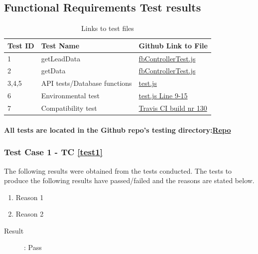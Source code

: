 \documentclass{article}
\begin{document}
\subsection{Functional Requirements Test results}
\begin{table}[H]
\centering
\label{link_table}
\begin{tabular}{|l|l|l|}
\hline
Test ID    & Test Name   & Github Link to File \\ \hline \hline
1          & getLeadData &  \href{https://github.com/QuintonWeenink/ValknutSolutions/blob/develop/test/fbControllerTest.js}{fbControllerTest.js}         \\ \hline
2          & getData  &  \href{https://github.com/QuintonWeenink/ValknutSolutions/blob/develop/test/fbControllerTest.js}{fbControllerTest.js}       \\ \hline
3,4,5      & API tests/Database functions & \href{https://github.com/QuintonWeenink/ValknutSolutions/blob/develop/test/test.js}{test.js}         \\ \hline
6          &  Environmental test  & \href{https://github.com/QuintonWeenink/ValknutSolutions/blob/develop/test/test.js}{test.js Line 9-15}\\ \hline
7		   & Compatibility test & \href{https://travis-ci.com/QuintonWeenink/ValknutSolutions/builds/30866212}{Travis CI build nr 130} \\ \hline
\end{tabular}
\caption{Links to test files}
\end{table}
\paragraph{All tests are located in the Github repo's testing directory:\href{https://github.com/QuintonWeenink/ValknutSolutions}{Repo}}


\subsubsection{Test Case 1 - TC \ref{test1}}
The following results were obtained from the tests conducted. The tests to produce the
following results have passed/failed and the reasons are stated below.
\begin{enumerate}
	\item Reason 1
	\item Reason 2
\end{enumerate}

\begin{description}
	\item [Result]: Pass 
\end{description}
\end{document}
